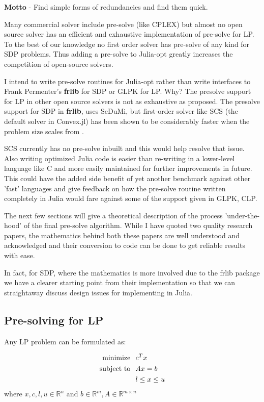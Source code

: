 \documentclass[twoside]{article}
\begin{document}
\begin{multicols}{2}
\textbf{\color{blue}Motto} - Find simple forms of redundancies and find them quick.


Many commercial solver include pre-solve (like CPLEX) but almost no open source solver has an efficient and exhaustive implementation of pre-solve for LP.
To the best of our knowledge no first order solver has pre-solve of any kind for SDP problems. Thus adding a pre-solve to Julia-opt greatly increases the competition of open-source solvers. 

I intend to write pre-solve routines for Julia-opt rather than write interfaces to Frank Permenter's \textbf{frlib} for SDP or GLPK for LP. 
Why? The presolve support for LP in other open source solvers is not as exhaustive as proposed. The presolve support for SDP in \textbf{frlib}, uses SeDuMi, but first-order solver like SCS (the default solver in Convex.jl) has been shown to be considerably faster when the problem size scales from \cite{o2013operator}. 

SCS currently has no pre-solve inbuilt and this would help resolve that issue. 
Also writing optimized Julia code is easier than re-writing in a lower-level language like C and more easily maintained for further improvements in future. This could have the added side benefit of 
yet another benchmark against other 'fast' languages and give feedback on how the pre-solve routine written completely in Julia would fare against some of the support given in GLPK, CLP.

The next few sections will give a theoretical description of the process 'under-the-hood' of the final pre-solve algorithm. 
While I have quoted two quality research papers, the mathematics behind both these papers are well understood and acknowledged and their conversion to code can be done to get reliable results with ease. 

In fact, for SDP, where the mathematics is more involved due to the frlib package we have a clearer starting point from their implementation so that we can straightaway discuss design issues for implementing in Julia. 

\vspace*{-\baselineskip}
\vspace{3mm}

\subsection{\textbf{Pre-solving for LP}}
Any LP problem can be formulated as:

\begin{align*}
\mbox{minimize} \hspace{0.1in} & c^Tx \\
\mbox{subject to} \hspace{0.1in} & Ax=b \\
\hspace{0.1in} & l \leq x \leq u 
\end{align*}
where $ x,c,l,u \in \mathbb{R}^n$ and $b \in \mathbb{R}^m, A \in \mathbb{R}^{m\times n} $


\end{multicols}
\end{document}
